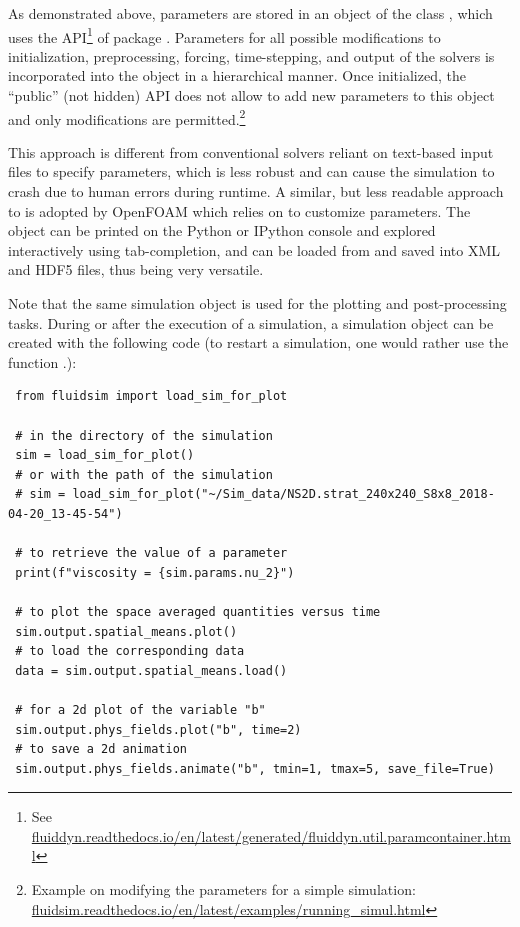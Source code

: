 \documentclass{../jors}
\begin{document}
As demonstrated above, parameters are stored in an object of the class
, which uses the
\href{https://fluiddyn.readthedocs.io/en/latest/generated/fluiddyn.util.paramcontainer.html}{}
API\footnote{See
\href{https://fluiddyn.readthedocs.io/en/latest/generated/fluiddyn.util.paramcontainer.html}{fluiddyn.readthedocs.io/en/latest/generated/fluiddyn.util.paramcontainer.html}}
of  package \cite{fluiddyn}.
%
Parameters for all possible modifications to initialization, preprocessing,
forcing, time-stepping, and output of the solvers is incorporated into the
object  in a hierarchical manner.
%
Once initialized, the ``public'' (not hidden) API does not allow to add new
parameters to this object and only modifications are permitted.\footnote{Example
on modifying the parameters for a simple simulation:
\href{https://fluidsim.readthedocs.io/en/latest/examples/running-simul-onlineplot.html}{%
fluidsim.readthedocs.io/en/latest/examples/running\_simul.html}}


This approach is different from conventional solvers reliant on
text-based input files to specify parameters, which is less robust and can
cause the simulation to crash due to human errors during runtime.
%
A similar, but less readable approach to  is
adopted by OpenFOAM which relies on  to customize
parameters.  The  object can be printed on the Python or
IPython console and explored interactively using tab-completion, and can be
loaded from and saved into XML and HDF5 files, thus being very versatile.

Note that the same simulation object is used for the plotting and post-processing
tasks.  During or after the execution of a simulation, a simulation object can be
created with the following code (to restart a simulation, one would rather use the
function .):
\begin{verbatim}
 from fluidsim import load_sim_for_plot

 # in the directory of the simulation
 sim = load_sim_for_plot()
 # or with the path of the simulation
 # sim = load_sim_for_plot("~/Sim_data/NS2D.strat_240x240_S8x8_2018-04-20_13-45-54")

 # to retrieve the value of a parameter
 print(f"viscosity = {sim.params.nu_2}")

 # to plot the space averaged quantities versus time
 sim.output.spatial_means.plot()
 # to load the corresponding data
 data = sim.output.spatial_means.load()

 # for a 2d plot of the variable "b"
 sim.output.phys_fields.plot("b", time=2)
 # to save a 2d animation
 sim.output.phys_fields.animate("b", tmin=1, tmax=5, save_file=True)
\end{verbatim}
\end{document}
